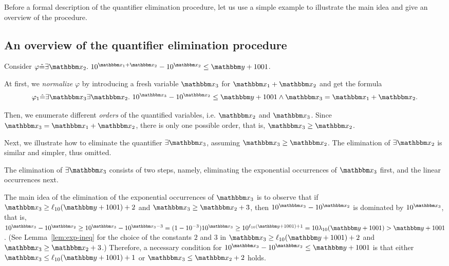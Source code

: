 Before a formal description of the quantifier elimination procedure, let us use a simple example to illustrate the main idea and give an overview of the procedure.

\vspace{-4mm}

\subsection{An overview of the quantifier elimination procedure}
Consider $\varphi \Def \exists \ivarx_2.\ 10^{\ivarx_1 + \ivarx_2} - 10^{\ivarx_2} \le \ivary + 1001$. 

At first, we \emph{normalize} $\varphi$ by introducing a fresh variable $\ivarx_3$ for $\ivarx_1 + \ivarx_2$ and get the formula 
$$\varphi_1 \Def \exists \ivarx_3 \exists \ivarx_2.\ 10^{\ivarx_3} - 10^{\ivarx_2} \le \ivary + 1001 \wedge \ivarx_3 = \ivarx_1 + \ivarx_2.$$

Then, we enumerate different \emph{orders} of the quantified variables, i.e. $\ivarx_2$ and $\ivarx_3$. Since $\ivarx_3 = \ivarx_1 + \ivarx_2$, there is only one possible order, that is, $\ivarx_3 \ge \ivarx_2$.

Next, we illustrate how to eliminate the quantifier $\exists \ivarx_3$, assuming $\ivarx_3 \ge \ivarx_2$. The elimination of $\exists \ivarx_2$ is similar and simpler, thus omitted.

The elimination of $\exists \ivarx_3$ consists of two steps, namely, eliminating the exponential occurrences of $\ivarx_3$ first, and the linear occurrences next.

The main idea of the elimination of the exponential occurrences of $\ivarx_3$ is to observe that if $\ivarx_3 \ge \ell_{10}(\ivary+1001)+2$ and $\ivarx_3 \ge \ivarx_2 + 3$, then $10^{\ivarx_3} - 10^{\ivarx_2}$ is dominated by $10^{\ivarx_3}$, that is, $10^{\ivarx_3} - 10^{\ivarx_2} \ge 10^{\ivarx_3} - 10^{\ivarx_3 - 3} = (1-10^{-3}) 10^{\ivarx_3} \ge 10^{\ell_{10}(\ivary+1001)+1} = 10\lambda_{10}(\ivary+1001) > \ivary+1001$. (See Lemma~\ref{lem:exp-ineq} for the choice of the constants $2$ and $3$ in $\ivarx_3 \ge \ell_{10}(\ivary+1001)+2$ and $\ivarx_3 \ge \ivarx_2 + 3$.)
Therefore, a necessary condition for $10^{\ivarx_3} - 10^{\ivarx_2} \le \ivary + 1001$ is that either $\ivarx_3 \le \ell_{10}(\ivary+1001)+1$ or $\ivarx_3 \le \ivarx_2 + 2$ holds.  

